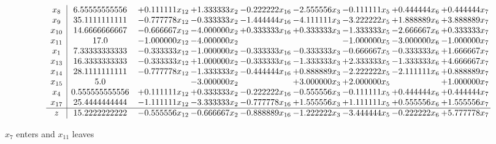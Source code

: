 \documentclass[10pt]{article}
\begin{document}
 \[\begin{array}{c| c c@{\hskip 2pt} c@{\hskip 2pt} c@{\hskip 2pt} c@{\hskip 2pt} c@{\hskip 2pt} c@{\hskip 2pt} c@{\hskip 2pt} }
 x_{8}   &  6.55555555556 & + 0.111111 x_{12} & + 1.333333 x_{2} & -0.222222 x_{16} & -2.555556 x_{3} & -0.111111 x_{5} & + 0.444444 x_{6} & + 0.444444 x_{7}\\
 x_{9}   &  35.1111111111 & -0.777778 x_{12} & -0.333333 x_{2} & -1.444444 x_{16} & -4.111111 x_{3} & -3.222222 x_{5} & + 1.888889 x_{6} & + 3.888889 x_{7}\\
 x_{10}   &  14.6666666667 & -0.666667 x_{12} & -4.000000 x_{2} & + 0.333333 x_{16} & + 0.333333 x_{3} & -1.333333 x_{5} & -2.666667 x_{6} & + 0.333333 x_{7}\\
 x_{11}   &  17.0 & -1.000000 x_{12} & -4.000000 x_{2} &    &   & -1.000000 x_{5} & -3.000000 x_{6} & -1.000000 x_{7}\\
 x_{1}   &  7.33333333333 & -0.333333 x_{12} & -1.000000 x_{2} & -0.333333 x_{16} & -0.333333 x_{3} & -0.666667 x_{5} & -0.333333 x_{6} & + 1.666667 x_{7}\\
 x_{13}   &  16.3333333333 & -0.333333 x_{12} & + 1.000000 x_{2} & -0.333333 x_{16} & -1.333333 x_{3} & + 2.333333 x_{5} & -1.333333 x_{6} & + 4.666667 x_{7}\\
 x_{14}   &  28.1111111111 & -0.777778 x_{12} & -1.333333 x_{2} & -0.444444 x_{16} & + 0.888889 x_{3} & -2.222222 x_{5} & -2.111111 x_{6} & + 0.888889 x_{7}\\
 x_{15}   &  5.0  &   & -3.000000 x_{2} &   & + 3.000000 x_{3} & + 2.000000 x_{5} &   & + 1.000000 x_{7}\\
 x_{4}   &  0.555555555556 & + 0.111111 x_{12} & + 0.333333 x_{2} & -0.222222 x_{16} & -0.555556 x_{3} & -0.111111 x_{5} & + 0.444444 x_{6} & + 0.444444 x_{7}\\
 x_{17}   &  25.4444444444 & -1.111111 x_{12} & -3.333333 x_{2} & -0.777778 x_{16} & + 1.555556 x_{3} & + 1.111111 x_{5} & + 0.555556 x_{6} & + 1.555556 x_{7}\\
\hline
z    &  15.2222222222 & -0.555556 x_{12} & -0.666667 x_{2} & -0.888889 x_{16} & -1.222222 x_{3} & -3.444444 x_{5} & -0.222222 x_{6} & + 5.777778 x_{7}\\
\end{array}\]


 $ x_{7} $ enters and $ x_{11} $ leaves 
\end{document}
